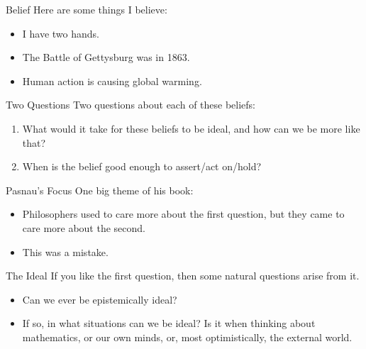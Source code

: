 \documentclass[
  17pt,
  letterpaper,
  ignorenonframetext,
  aspectratio=169,
]{beamer}
\providecommand{\tightlist}{%
  \setlength{\itemsep}{0pt}\setlength{\parskip}{0pt}}\usepackage{longtable,booktabs,array}
\begin{document}
\begin{frame}{Belief}
\protect\hypertarget{belief}{}
Here are some things I believe: \pause

\begin{itemize}[<+->]
\tightlist
\item
  I have two hands.
\item
  The Battle of Gettysburg was in 1863.
\item
  Human action is causing global warming.
\end{itemize}
\end{frame}

\begin{frame}{Two Questions}
\protect\hypertarget{two-questions}{}
Two questions about each of these beliefs: \pause

\begin{enumerate}[<+->]
\tightlist
\item
  What would it take for these beliefs to be ideal, and how can we be
  more like that?
\item
  When is the belief good enough to assert/act on/hold?
\end{enumerate}
\end{frame}

\begin{frame}{Pasnau's Focus}
\protect\hypertarget{pasnaus-focus}{}
One big theme of his book:

\begin{itemize}[<+->]
\tightlist
\item
  Philosophers used to care more about the first question, but they came
  to care more about the second.
\item
  This was a mistake.
\end{itemize}
\end{frame}

\begin{frame}{The Ideal}
\protect\hypertarget{the-ideal}{}
If you like the first question, then some natural questions arise from
it.

\begin{itemize}[<+->]
\tightlist
\item
  Can we ever be epistemically ideal?
\item
  If so, in what situations can we be ideal? Is it when thinking about
  mathematics, or our own minds, or, most optimistically, the external
  world.
\end{itemize}
\end{frame}
\end{document}
